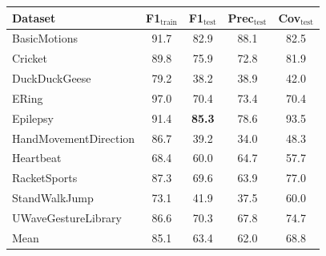 \begin{tabular}{lcccc}
\toprule
Dataset & F1$_{\text{train}}$ & F1$_{\text{test}}$ & Prec$_{\text{test}}$ & Cov$_{\text{test}}$ \\
\midrule
BasicMotions & 91.7 & 82.9 & 88.1 & 82.5 \\
Cricket & 89.8 & 75.9 & 72.8 & 81.9 \\
DuckDuckGeese & 79.2 & 38.2 & 38.9 & 42.0 \\
ERing & 97.0 & 70.4 & 73.4 & 70.4 \\
Epilepsy & 91.4 & \textbf{85.3} & 78.6 & 93.5 \\
HandMovementDirection & 86.7 & 39.2 & 34.0 & 48.3 \\
Heartbeat & 68.4 & 60.0 & 64.7 & 57.7 \\
RacketSports & 87.3 & 69.6 & 63.9 & 77.0 \\
StandWalkJump & 73.1 & 41.9 & 37.5 & 60.0 \\
UWaveGestureLibrary & 86.6 & 70.3 & 67.8 & 74.7 \\
\midrule
Mean & 85.1 & 63.4 & 62.0 & 68.8 \\
\bottomrule
\end{tabular}
